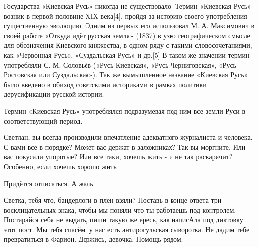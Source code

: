 \begin{itemize}
Государства «Киевская Русь» никогда не существовало. Термин «Киевская Русь»
возник в первой половине XIX века[4], пройдя за историю своего употребления
существенную эволюцию. Одним из первых его использовал М. А. Максимович в своей
работе «Откуда идёт русская земля» (1837) в узко географическом смысле для
обозначения Киевского княжества, в одном ряду с такими словосочетаниями, как
«Червонная Русь», «Суздальская Русь» и др.[5] В таком же значении термин
употребляли С. М. Соловьёв («Русь Киевская», «Русь Черниговская», «Русь
Ростовская или Суздальская»). Так же вымышленное название «Киевская Русь» было
введено в обиход советскими историками в рамках политики дерусификации русской
истории.

Термин «Киевская Русь» употреблялся подразумевая под ним все земли Руси в
соответствующий период.

 

Светлан, вы всегда производили впечатление адекватного журналиста и человека. С
вами все в порядке? Может вас держат в заложниках? Так вы моргните. Или вас
покусали упоротые? Или все таки, хочешь жить - и не так раскарячит? Особенно,
если хочешь хорошо жить🤔


 
Придётся отписаться. А жаль \Smiley[1.0][yellow]

 

Светка, тебя что, бандерлоги в плен взяли? Поставь в конце ответа три
восклицательных знака, чтобы мы поняли что ты работаешь под контролем.
Постарайся себя не выдать, пиши такую же ересь, как написАла под диктовку этот
пост. Мы тебя спасём, у нас есть антирогульская сыворотка. Не дадим тебе
превратиться в Фарион. Держись, девочка. Помощь рядом.


 


\end{itemize}
